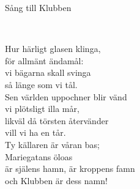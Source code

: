 \begin{song}{Sång till Klubben}
	
	
	\\
	
	
	Hur härligt glasen klinga,\\
	för allmänt ändamål:\\
	vi bägarna skall svinga\\
	så länge som vi tål.\\
	Sen världen uppochner blir vänd\\
	vi plötsligt illa mår,\\
	likväl då törsten återvänder\\
	vill vi ha en tår.\\
	Ty källaren är våran bas;\\
	Mariegatans öloas\\
	är själens hamn, är kroppens famn\\
	och Klubben är dess namn!
	
\end{song}
